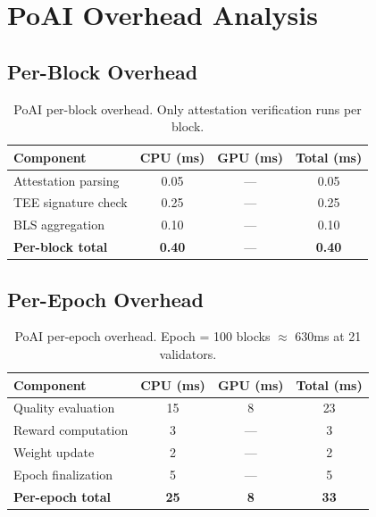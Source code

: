 \section{PoAI Overhead Analysis}

\label{sec:poai-overhead}

\subsection{Per-Block Overhead}

\begin{table}[t]
\centering
\begin{tabular}{lccc}
\toprule
\textbf{Component} & \textbf{CPU (ms)} & \textbf{GPU (ms)} & \textbf{Total (ms)} \\
\midrule
Attestation parsing & 0.05 & --- & 0.05 \\
TEE signature check & 0.25 & --- & 0.25 \\
BLS aggregation & 0.10 & --- & 0.10 \\
\midrule
\textbf{Per-block total} & \textbf{0.40} & --- & \textbf{0.40} \\
\bottomrule
\end{tabular}
\caption{PoAI per-block overhead. Only attestation verification runs per block.}
\label{tab:per-block}
\end{table}

\subsection{Per-Epoch Overhead}

\begin{table}[t]
\centering
\begin{tabular}{lccc}
\toprule
\textbf{Component} & \textbf{CPU (ms)} & \textbf{GPU (ms)} & \textbf{Total (ms)} \\
\midrule
Quality evaluation & 15 & 8 & 23 \\
Reward computation & 3 & --- & 3 \\
Weight update & 2 & --- & 2 \\
Epoch finalization & 5 & --- & 5 \\
\midrule
\textbf{Per-epoch total} & \textbf{25} & \textbf{8} & \textbf{33} \\
\bottomrule
\end{tabular}
\caption{PoAI per-epoch overhead. Epoch = 100 blocks $\approx$ 630ms at 21 validators.}
\label{tab:per-epoch}
\end{table}

